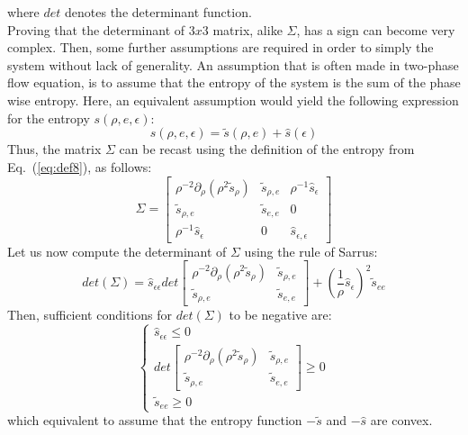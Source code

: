 \documentclass{article}
\newcommand{\eqt}[1]{Eq.~(\ref{#1})}                     %
\begin{document}
where $det$ denotes the determinant function.\\
Proving that the determinant of $3x3$ matrix, alike $\Sigma$, has a sign can become very complex. Then, some further assumptions are required in order to simply the system without lack of generality. An assumption that is often made in two-phase flow equation, is to assume that the entropy of the system is the sum of the phase wise entropy. Here, an equivalent assumption would yield the following expression for the entropy $s(\rho, e, \epsilon)$:
\begin{equation}
\label{eq:def8}
s(\rho, e, \epsilon) = \tilde{s}(\rho,e) + \hat{s}(\epsilon) 
\end{equation}
Thus, the matrix $\Sigma$ can be recast using the definition of the entropy from \eqt{eq:def8}, as follows:
\begin{equation}
\label{eq:def9}
\Sigma = 
\left[
\begin{array}{ccc}
\rho ^{-2} \partial_{\rho} \left( \rho^2 \tilde{s}_{\rho} \right) & \tilde{s}_{\rho,e} & \rho^{-1} \hat{s}_{\epsilon} \\
\tilde{s}_{\rho,e} & \tilde{s}_{e,e} & 0 \\
\rho^{-1} \hat{s}_{\epsilon} & 0 & \hat{s}_{\epsilon, \epsilon} 
\end{array}
\right]
\end{equation}
Let us now compute the determinant of $\Sigma$ using the rule of Sarrus:
\begin{equation}
det(\Sigma) = \hat{s}_{\epsilon \epsilon} 
det \left[ 
\begin{array}{cc}
\rho ^{-2} \partial_{\rho} \left( \rho^2 \tilde{s}_{\rho} \right) & \tilde{s}_{\rho,e} \\
\tilde{s}_{\rho,e} & \tilde{s}_{e,e}
\end{array}
\right]
+ \left( \frac{1}{\rho} \hat{s}_\epsilon \right)^2 \tilde{s}_{ee}
\end{equation}
Then, sufficient conditions for $det(\Sigma)$ to be negative are:
\begin{equation}
\label{eq:def10}
\left\{
\begin{array}{lll}
\hat{s}_{\epsilon \epsilon} \leq 0 \\
det \left[ 
\begin{array}{cc}
\rho ^{-2} \partial_{\rho} \left( \rho^2 \tilde{s}_{\rho} \right) & \tilde{s}_{\rho,e} \\
\tilde{s}_{\rho,e} & \tilde{s}_{e,e}
\end{array}
\right] \geq 0 \\
\tilde{s}_{ee} \geq 0 
\end{array}
\right.
\end{equation}
which equivalent to assume that the entropy function $-\tilde{s}$ and $-\hat{s}$ are convex.
\end{document}
